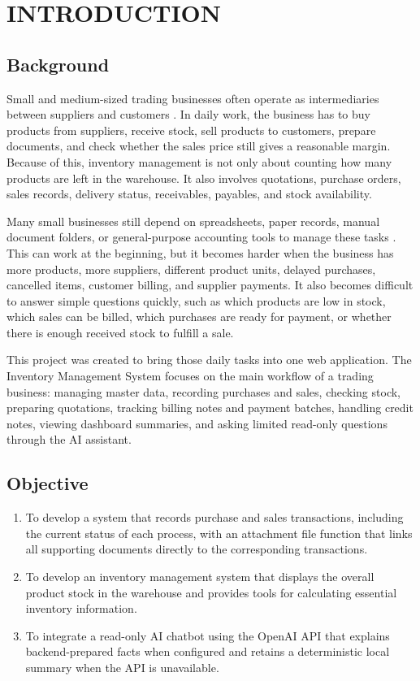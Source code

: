 \chapter{INTRODUCTION}

\section{Background}
Small and medium-sized trading businesses often operate as intermediaries between suppliers and customers \cite{naics_2022_wholesale_trade}. In daily work, the business has to buy products from suppliers, receive stock, sell products to customers, prepare documents, and check whether the sales price still gives a reasonable margin. Because of this, inventory management is not only about counting how many products are left in the warehouse. It also involves quotations, purchase orders, sales records, delivery status, receivables, payables, and stock availability.

Many small businesses still depend on spreadsheets, paper records, manual document folders, or general-purpose accounting tools to manage these tasks \cite{bishop2008spreadsheet,times_sage_sole_traders_2025}. This can work at the beginning, but it becomes harder when the business has more products, more suppliers, different product units, delayed purchases, cancelled items, customer billing, and supplier payments. It also becomes difficult to answer simple questions quickly, such as which products are low in stock, which sales can be billed, which purchases are ready for payment, or whether there is enough received stock to fulfill a sale.

This project was created to bring those daily tasks into one web application. The Inventory Management System focuses on the main workflow of a trading business: managing master data, recording purchases and sales, checking stock, preparing quotations, tracking billing notes and payment batches, handling credit notes, viewing dashboard summaries, and asking limited read-only questions through the AI assistant.

\section{Objective}
\begin{enumerate}
	\item To develop a system that records purchase and sales transactions, including the current status of each process, with an attachment file function that links all supporting documents directly to the corresponding transactions.
	\item To develop an inventory management system that displays the overall product stock in the warehouse and provides tools for calculating essential inventory information.
	\item To integrate a read-only AI chatbot using the OpenAI API that explains backend-prepared facts when configured and retains a deterministic local summary when the API is unavailable.
\end{enumerate}

